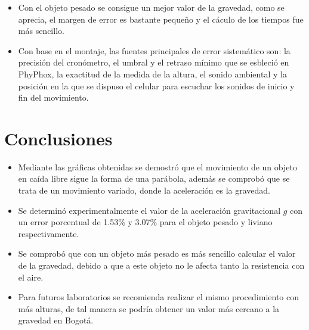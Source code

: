 \begin{multicols}{2}
\begin{itemize}
    \item Con el objeto pesado se consigue un mejor valor de la gravedad, como se aprecia, el margen de error es bastante pequeño y el cáculo de los tiempos fue más sencillo.\\
    \item Con base en el montaje, las fuentes principales de error sistemático son: la precisión del cronómetro, el umbral y el retraso mínimo que se esbleció en PhyPhox, 
    la exactitud de la medida de la altura, el sonido ambiental y la posición en la que se dispuso el celular para escuchar los sonidos de inicio y fin del movimiento.\\
\end{itemize}


\section*{Conclusiones} 
\begin{itemize}
    \item Mediante las gráficas obtenidas se demostró que el movimiento de un objeto en caída libre sigue la forma de una parábola, además se comprobó que se trata de un movimiento variado, donde la aceleración es la gravedad.
    \item Se determinó experimentalmente el valor de la aceleración gravitacional $g$ con un error porcentual de 1.53\% y 3.07\% para el objeto pesado y liviano respectivamente.
    \item Se comprobó que con un objeto más pesado es más sencillo calcular el valor de la gravedad, debido a que a este objeto no le afecta tanto la resistencia con el aire.
    \item Para futuros laboratorios se recomienda realizar el mismo procedimiento con más alturas, de tal manera se podría obtener un valor más cercano a la gravedad en Bogotá.
\end{itemize}

\nocite{*} %
\printbibliography

\end{multicols}